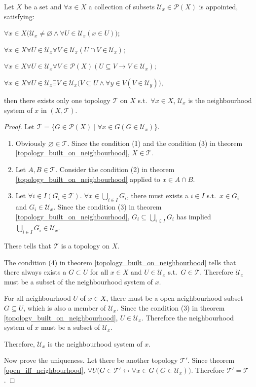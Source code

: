 \documentclass[openany]{book}
\begin{document}
\begin{theorem}\label{topology_built_on_neighbourhood}
Let $X$ be a set and $\forall x \in X$ a collection of subsets $\mathscr U_x \in \mathscr P(X)$ is appointed, satisfying:
\begin{conditionlist}[label=(\arabic*)]
\item $\forall x\in X\big(
	\mathscr U_x \neq \varnothing \wedge
		\forall U\in \mathscr U_x (x\in U)\big)$; 
\item $\forall x\in X\forall U\in\mathscr U_x\forall V\in\mathscr U_x (
	U\cap V\in \mathscr U_x)$;
\item $\forall x\in X\forall U\in\mathscr U_x\forall V\in \mathscr P(X)( 
	U\subseteq V \to V\in \mathscr U_x)$;
\item $\forall x\in X\forall U\in\mathscr U_x\exists V\in\mathscr U_x \big(
	V\subseteq U \wedge \forall y\in V(V\in \mathscr U_y)\big)$,
\end{conditionlist}
then there exists only one topology $\mathscr T$ on $X$ s.t.\ $\forall x\in X$, $\mathscr U_x$ is the neighbourhood system of $x$ in $(X,\mathscr T)$.
\end{theorem}
\begin{proof}
Let $\mathscr T = \{G\in \mathscr P(X) \mid \forall x\in G( G\in \mathscr U_x)\}$.
\begin{enumerate}[label=\alph*)]
\item Obviously $\varnothing \in \mathscr T$. 
	Since the condition (1) and the condition (3) in theorem \ref{topology_built_on_neighbourhood}, $X\in \mathscr T$.
\item Let $A, B\in \mathscr T$. Consider the condition (2) in theorem \ref{topology_built_on_neighbourhood} applied to $x\in A\cap B$.
\item Let $\forall i\in I( G_i \in \mathscr T)$. 
$\forall x\in \bigcup_{i\in I} G_i$, there must exists a $i\in I$ s.t.\ $x\in G_i$ and $G_i \in \mathscr U_x$. 
Since the condition (3) in theorem \ref{topology_built_on_neighbourhood}, $G_i \subseteq \bigcup_{i\in I} G_i$ has implied $\bigcup_{i\in I} G_i \in \mathscr U_x$.
\end{enumerate}
These tells that $\mathscr T$ is a topology on $X$.

The condition (4) in theorem \ref{topology_built_on_neighbourhood} tells that there always exists a $G\subset U$ for all $x\in X$ and $U\in \mathscr U_x$ s.t.\ $G\in \mathscr T$. Therefore $\mathscr U_x$ must be a subset of the neighbourhood system of $x$. 

For all neighbourhood $U$ of $x\in X$, there must be a open neighbourhood subset $G\subseteq U$, which is also a member of $\mathscr U_x$. Since the condition (3) in theorem \ref{topology_built_on_neighbourhood}, $U\in \mathscr U_x$. Therefore the neighbourhood system of $x$ must be a subset of $\mathscr U_x$. 

Therefore, $\mathscr U_x$ is the neighbourhood system of $x$.

Now prove the uniqueness. Let there be another topology $\mathscr T '$.
Since theorem \ref{open_iff_neighbourhood}, 
$\forall U\big(
	G\in \mathscr T' \leftrightarrow 
		\forall x\in G(
			G\in \mathscr U_x)\big)$. 
Therefore $\mathscr T' = \mathscr T$.
\end{proof}
\end{document}
